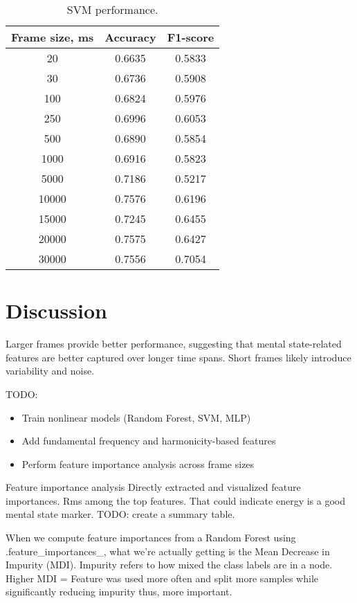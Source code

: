 \documentclass[conference]{IEEEtran}
\begin{document}

\begin{table}[h]
\centering
\caption{SVM performance.}
\begin{tabular}{|c|c|c|}
\hline
\textbf{Frame size, ms} & \textbf{Accuracy} & \textbf{F1-score}\\
\hline
20 & 0.6635 & 0.5833 \\
\hline
30 & 0.6736 & 0.5908 \\
\hline
100 & 0.6824 & 0.5976 \\
\hline
250 & 0.6996 & 0.6053 \\
\hline
500 & 0.6890 & 0.5854 \\
\hline
1000 & 0.6916 & 0.5823 \\
\hline
5000 & 0.7186 & 0.5217 \\
\hline
10000 & 0.7576 & 0.6196 \\
\hline
15000 & 0.7245 & 0.6455 \\
\hline
20000 & 0.7575 & 0.6427 \\
\hline
30000 & 0.7556 & 0.7054 \\
\hline
\end{tabular}
\label{tab:linear_model_perf}
\end{table}

\section{Discussion}
Larger frames provide better performance, suggesting that mental state-related features are better captured over longer time spans. 
Short frames likely introduce variability and noise.

TODO:
\begin{itemize}
    \item Train nonlinear models (Random Forest, SVM, MLP)
    \item Add fundamental frequency and harmonicity-based features
    \item Perform feature importance analysis across frame sizes
\end{itemize}

Feature importance analysis
Directly extracted and visualized feature importances. Rms among the top features. That could indicate energy is a good mental state marker.
TODO: create a summary table.




When we compute feature importances from a Random Forest using .feature_importances_, what we're actually getting is the Mean Decrease in Impurity (MDI). 
Impurity refers to how mixed the class labels are in a node.
Higher MDI = Feature was used more often and split more samples while significantly reducing impurity thus, 
more important.
\end{document}

